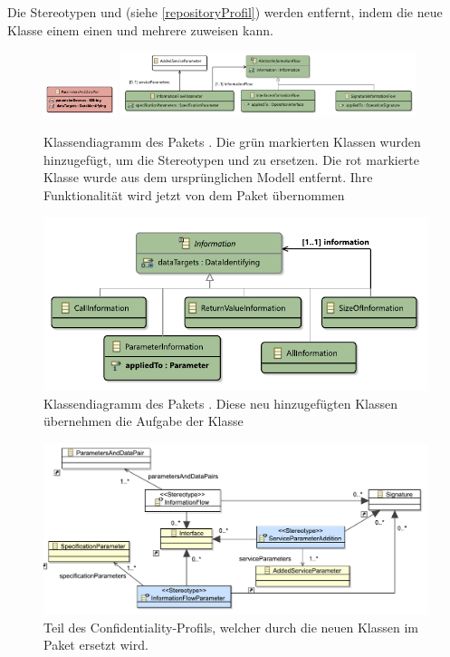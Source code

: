 \documentclass[twoside, ngerman]{sdqseminar}
\begin{document}
Die Stereotypen  und  (siehe \autoref{repositoryProfil}) werden entfernt, indem die neue Klasse  einem  einen  und mehrere  zuweisen kann.
\begin{figure}[b]
	\centering
	\includegraphics[width=0.19\textwidth]{images/old/repository.pdf}
	\includegraphics[width=0.77\textwidth]{images/new/repository.pdf}
	\caption{Klassendiagramm des Pakets . Die grün markierten Klassen wurden hinzugefügt, um die Stereotypen   und  zu ersetzen. Die rot markierte Klasse  wurde aus dem ursprünglichen Modell entfernt. Ihre Funktionalität wird jetzt von dem Paket  übernommen}\label{repositoryPackage}
\end{figure}
\begin{figure}
\centering
\includegraphics[width=\textwidth]{images/new/information.pdf}
\caption{Klassendiagramm des Pakets . Diese neu hinzugefügten Klassen übernehmen die Aufgabe der  Klasse}\label{informationPackage}
\end{figure}
\begin{figure}	
	\centering
	\includegraphics[width=\textwidth]{images/old/repositoryProfile.pdf}
	\caption{Teil des Confidentiality-Profils, welcher durch die neuen Klassen im Paket  ersetzt wird.}\label{repositoryProfil}
\end{figure}
\end{document}
